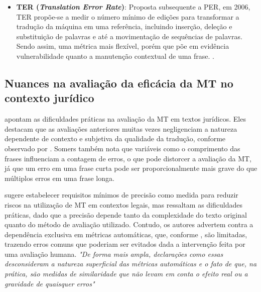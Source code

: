 \begin{itemize}

    
\item \textbf{TER (\textit{Translation Error Rate})}: Proposta subsequente a PER, em 2006, TER propõe-se a medir o número mínimo de edições para transformar a tradução da máquina em uma referência, incluindo inserção, deleção e substituição de palavras e até a movimentação de sequências de palavras. Sendo assim, uma métrica mais flexível, porém que põe em evidência vulnerabilidade quanto a manutenção contextual de uma frase. \cite[p. 168]{cheragui}.


\end{itemize}

\subsection{\textbf{Nuances na avaliação da eficácia da MT no contexto jurídico}}

 apontam as dificuldades práticas na avaliação da MT em textos jurídicos. Eles destacam que as avaliações anteriores muitas vezes negligenciam a natureza dependente de contexto e subjetiva da qualidade da tradução, conforme observado por . Somers também nota que variáveis como o comprimento das frases influenciam a contagem de erros, o que pode distorcer a avaliação da MT, já que um erro em uma frase curta pode ser proporcionalmente mais grave do que múltiplos erros em uma frase longa.

 sugere estabelecer requisitos mínimos de precisão como medida para reduzir riscos na utilização de MT em contextos legais, mas  ressaltam as dificuldades práticas, dado que a precisão depende tanto da complexidade do texto original quanto do método de avaliação utilizado. Contudo, os autores advertem contra a dependência exclusiva em métricas automáticas, que, conforme \cite{callison}, são limitadas, trazendo erros comuns que poderiam ser evitados dada a intervenção feita por uma avaliação humana. \textit{"De forma mais ampla, declarações como essas desconsideram a natureza superficial das métricas automáticas e o fato de que, na prática, são medidas de similaridade que não levam em conta o efeito real ou a gravidade de quaisquer erros"} \cite{VHS}


